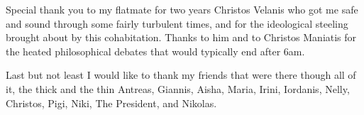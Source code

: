\begin{precontent}
Special thank you to my flatmate for two years Christos Velanis who
got me safe and sound through some fairly turbulent times, and for the
ideological steeling brought about by this cohabitation. Thanks to him
and to Christos Maniatis for the heated philosophical debates that
would typically end after 6am.

Last but not least I would like to thank my friends that were there
though all of it, the thick and the thin Antreas, Giannis, Aisha,
Maria, Irini, Iordanis, Nelly, Christos, Pigi, Niki, The President,
and Nikolas.






\end{precontent}


\tableofcontents

\cleardoublepage
{}
{}
\listoffigures
\listoflistings

\cleardoublepage%
